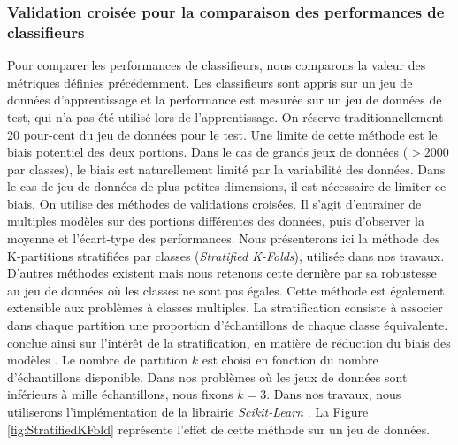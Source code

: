 
\subsubsection{Validation croisée pour la comparaison des performances de classifieurs} \label{subsubsec:cross_val}
Pour comparer les performances de classifieurs, nous comparons la valeur des métriques définies précédemment.
Les classifieurs sont appris sur un jeu de données d'apprentissage et la performance est mesurée sur un jeu de données de test, qui n'a pas été utilisé lors de l'apprentissage.
On réserve traditionnellement 20 pour-cent du jeu de données pour le test.
Une limite de cette méthode est le biais potentiel des deux portions.
Dans le cas de grands jeux de données ($> 2 000$ par classes), le biais est naturellement limité par la variabilité des données.
Dans le cas de jeu de données de plus petites dimensions, il est nécessaire de limiter ce biais.
On utilise des méthodes de validations croisées.
Il s'agit d'entrainer de multiples modèles sur des portions différentes des données, puis d'observer la moyenne et l'écart-type des performances.
Nous présenterons ici la méthode des K-partitions stratifiées par classes (\textit{Stratified K-Folds}), utilisée dans nos travaux.
D'autres méthodes existent mais nous retenons cette dernière par sa robustesse au jeu de données où les classes ne sont pas égales.
Cette méthode est également extensible aux problèmes à classes multiples.
La stratification consiste à associer dans chaque partition une proportion d'échantillons de chaque classe équivalente.
\citeauthor{kohavi_study_1995} conclue ainsi sur l'intérêt de la stratification, en matière de réduction du biais des modèles \cite{kohavi_study_1995}.
Le nombre de partition $k$ est choisi en fonction du nombre d'échantillons disponible.
Dans nos problèmes où les jeux de données sont inférieurs à mille échantillons, nous fixons $k=3$.
Dans nos travaux, nous utiliserons l'implémentation de la librairie \textit{Scikit-Learn} \cite{pedregosa_scikit-learn_2011}.
La Figure \ref{fig:StratifiedKFold} représente l'effet de cette méthode sur un jeu de données.

